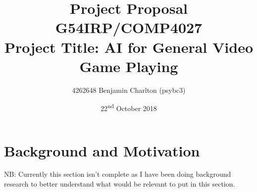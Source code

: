 \documentclass[a4paper]{article}
\begin{document}
\title{
    Project Proposal
    \\ \large{G54IRP/COMP4027}
    \\ \large{Project Title: AI for General Video Game Playing}\vspace{-3ex}}
\author{4262648 Benjamin Charlton (psybc3)}
\date{\vspace{-2ex}22\textsuperscript{nd} October 2018}
\maketitle

\section{Background and Motivation}
NB:  Currently this section isn't complete as I have been doing background research to better understand what would be relevant to put in this section.
\par
\pagebreak
\end{document}
